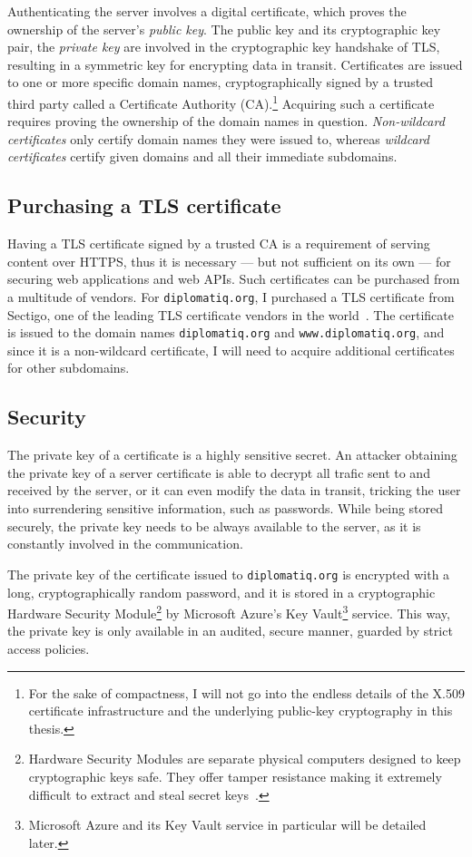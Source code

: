 Authenticating the server involves a digital certificate, which proves the ownership of the server's \emph{public key}. The public key and its cryptographic key pair, the \emph{private key} are involved in the cryptographic key handshake of TLS, resulting in a symmetric key for encrypting data in transit. Certificates are issued to one or more specific domain names, cryptographically signed by a trusted third party called a Certificate Authority (CA).\footnote{For the sake of compactness, I will not go into the endless details of the X.509 certificate infrastructure and the underlying public-key cryptography in this thesis.} Acquiring such a certificate requires proving the ownership of the domain names in question. \emph{Non-wildcard certificates} only certify domain names they were issued to, whereas \emph{wildcard certificates} certify given domains and all their immediate subdomains.

\subsection{Purchasing a TLS certificate}

Having a TLS certificate signed by a trusted CA is a requirement of serving content over HTTPS, thus it is necessary — but not sufficient on its own — for securing web applications and web APIs. Such certificates can be purchased from a multitude of vendors. For \lstinline{diplomatiq.org}, I purchased a TLS certificate from Sectigo, one of the leading TLS certificate vendors in the world~\cite{sectigo-website}. The certificate is issued to the domain names \lstinline{diplomatiq.org} and \lstinline{www.diplomatiq.org}, and since it is a non-wildcard certificate, I will need to acquire additional certificates for other subdomains.

\subsection{Security}

The private key of a certificate is a highly sensitive secret. An attacker obtaining the private key of a server certificate is able to decrypt all trafic sent to and received by the server, or it can even modify the data in transit, tricking the user into surrendering sensitive information, such as passwords. While being stored securely, the private key needs to be always available to the server, as it is constantly involved in the communication.

The private key of the certificate issued to \lstinline{diplomatiq.org} is encrypted with a long, cryptographically random password, and it is stored in a cryptographic Hardware Security Module\footnote{Hardware Security Modules are separate physical computers designed to keep cryptographic keys safe. They offer tamper resistance making it extremely difficult to extract and steal secret keys~\cite{fips-140-3}.} by Microsoft Azure's Key Vault\footnote{Microsoft Azure and its Key Vault service in particular will be detailed later.} service. This way, the private key is only available in an audited, secure manner, guarded by strict access policies.

